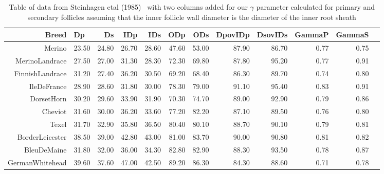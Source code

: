 \begin{table}[ht]
\label{tab:stein}
\centering
\caption{Table of data from Steinhagen etal (1985)~\cite{stei:85} with two columns added for our $\gamma$ parameter calculated for primary and secondary follicles assuming that the inner follicle wall diameter is the diameter of the inner root sheath}
\vspace{0.1in}
\scriptsize
\begin{tabular}{rlrrrrrrrrrr}
  \hline
  Breed & Dp & Ds & IDp & IDs & ODp & ODs & DpovIDp & DsovIDs & GammaP & GammaS \\ 
  \hline
 Merino & 23.50 & 24.80 & 26.70 & 28.60 & 47.60 & 53.00 & 87.90 & 86.70 & 0.77 & 0.75 \\ 
 MerinoLandrace & 27.50 & 27.00 & 31.30 & 28.30 & 72.30 & 69.80 & 87.80 & 95.20 & 0.77 & 0.91 \\ 
 FinnishLandrace & 31.20 & 27.40 & 36.20 & 30.50 & 69.20 & 68.40 & 86.30 & 89.70 & 0.74 & 0.80 \\ 
 IleDeFrance & 28.90 & 28.60 & 31.80 & 30.00 & 78.30 & 79.00 & 91.10 & 95.40 & 0.83 & 0.91 \\ 
 DorsetHorn & 30.20 & 29.60 & 33.90 & 31.90 & 70.30 & 74.70 & 89.00 & 92.90 & 0.79 & 0.86 \\ 
 Cheviot & 31.60 & 30.00 & 36.20 & 33.60 & 77.20 & 82.20 & 87.10 & 89.50 & 0.76 & 0.80 \\ 
 Texel & 31.70 & 32.90 & 35.80 & 36.50 & 80.40 & 80.10 & 88.70 & 90.10 & 0.79 & 0.81 \\ 
 BorderLeicester & 38.50 & 39.00 & 42.80 & 43.00 & 81.00 & 83.70 & 90.00 & 90.80 & 0.81 & 0.82 \\ 
 BleuDeMaine & 31.80 & 32.00 & 36.00 & 34.30 & 82.80 & 82.90 & 88.30 & 93.50 & 0.78 & 0.87 \\ 
 GermanWhitehead & 39.60 & 37.60 & 47.00 & 42.50 & 89.20 & 86.30 & 84.30 & 88.60 & 0.71 & 0.78 \\ 
   \hline
\end{tabular}
\end{table}

